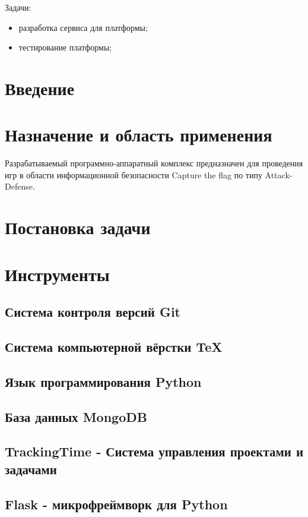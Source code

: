 Задачи:
\begin{itemize}
\item разработка сервиса для платформы;
\item тестирование платформы;
\end{itemize}

 \newpage
 \tableofcontents

 \newpage
 \section*{Введение}
 
 \newpage
 \section{Назначение и область применения}
Разрабатываемый программно-аппаратный комплекс предназначен для проведения игр в области информационной безопасности Capture the flag по типу Attack-Defense.
\section{Постановка задачи}
\setcounter{figure}{0}

\section{Инструменты}
\setcounter{figure}{0}
\subsection{Система контроля версий Git}

\subsection{Система компьютерной вёрстки \TeX}

\subsection{Язык программирования Python}

\subsection{База данных MongoDB}

\subsection{TrackingTime - Система управления проектами и задачами}

\subsection{Flask - микрофреймворк для Python}

